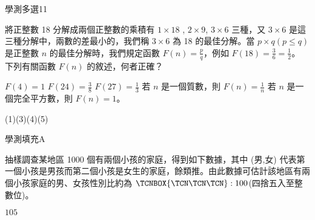     \begin{QUESTION}
        \begin{ExamInfo}{95}{學測}{多選}{11}
        \end{ExamInfo}
        \begin{ExamAnsRateInfo}{76}{98}{89}{41}
        \end{ExamAnsRateInfo}
        \begin{QBODY}
            將正整數 18 分解成兩個正整數的乘積有 $1\times 18$ , $2\times 9$, $3\times 6$ 三種，又 $3 \times 6$ 是這三種分解中，兩數的差最小的，我們稱 $3 \times 6$ 為 18 的最佳分解。當 $p\times q (p \leq q)$ 是正整數 $n$ 的最佳分解時，我們規定函數 $F(n)=\frac{p}{q}$，例如 $F(18)=\frac{3}{6}=\frac{1}{2}$。
			下列有關函數 $F(n)$ 的敘述，何者正確？ 
			\begin{QOPS} 
				\QOP $F(4) =1$    \QOP $F(24)=\frac{3}{8}$ 
				\QOP $F(27)=\frac{1}{3}$ 
				\QOP 若 $n$ 是一個質數，則 $F(n)=\frac{1}{n}$ 
				\QOP 若 $n$ 是一個完全平方數，則 $F(n) =1$。
			\end{QOPS}
        \end{QBODY}
        \begin{QFROMS}
        \end{QFROMS}
        \begin{QTAGS}\end{QTAGS}
        \begin{QANS}
            (1)(3)(4)(5)
        \end{QANS}
        \begin{QSOLLIST}
        \end{QSOLLIST}
        \begin{QEMPTYSPACE}
        \end{QEMPTYSPACE}
    \end{QUESTION}
    \begin{QUESTION}
        \begin{ExamInfo}{95}{學測}{填充}{A}
        \end{ExamInfo}
        \begin{ExamAnsRateInfo}{44}{80}{44}{8}
        \end{ExamAnsRateInfo}
        \begin{QBODY}
            抽樣調查某地區 1000 個有兩個小孩的家庭，得到如下數據，其中 (男,女) 代表第一個小孩是男孩而第二個小孩是女生的家庭，餘類推。由此數據可估計該地區有兩個小孩家庭的男、女孩性別比約為 $\TCNBOX{\TCN\TCN\TCN}:100 $(四捨五入至整數位)。
        \end{QBODY}
        \begin{QFROMS}
        \end{QFROMS}
        \begin{QTAGS}\end{QTAGS}
        \begin{QANS}
            $105$
        \end{QANS}
        \begin{QSOLLIST}
        \end{QSOLLIST}
        \begin{QEMPTYSPACE}
        \end{QEMPTYSPACE}
    \end{QUESTION}
